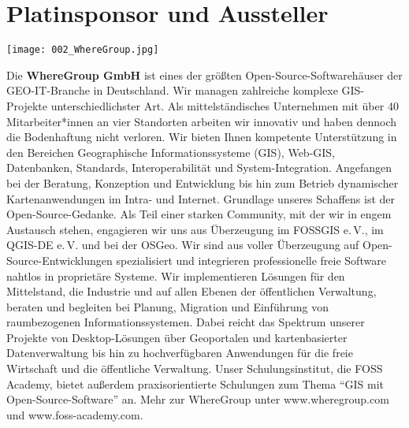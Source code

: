 \section*{Platinsponsor und Aussteller}
\begin{center}
  \centerline{\texttt{[image: 002\_WhereGroup.jpg]}}
\end{center}
\vspace*{-0.4cm}

\noindent
Die {\bfseries WhereGroup GmbH} ist eines der größten Open-Source-Software\-häuser der GEO-IT-Branche in Deutschland. Wir managen zahlreiche komplexe GIS-Projekte unterschiedlichster Art. Als mittelständisches Unternehmen mit über 40 Mitarbeiter*innen an vier Standorten arbeiten wir innovativ und haben dennoch die Bodenhaftung nicht verloren.
Wir bieten Ihnen kompetente Unterstützung in den Bereichen Geographische Informationssysteme (GIS), Web-GIS, Datenbanken, Standards, Interoperabilität und System-Integration. Angefangen bei der Beratung, Konzeption und Entwicklung bis hin zum Betrieb dynamischer Kartenanwendungen im Intra- und Internet.
Grundlage unseres Schaffens ist der Open-Source-Gedanke. Als Teil einer starken Community, mit der wir in engem Austausch stehen, engagieren wir uns aus Überzeugung im FOSSGIS e.\,V., im QGIS-DE e.\,V. und bei der OSGeo. Wir sind aus voller Überzeugung auf Open-Source-Entwicklungen spezialisiert und integrieren professionelle freie Software nahtlos in proprietäre Systeme.
Wir implementieren Lösungen für den Mittelstand, die Industrie und auf allen Ebenen der öffentlichen Verwaltung, beraten und begleiten bei Planung, Migration und Einführung von raumbezogenen Informationssystemen.
Dabei reicht das Spektrum unserer Projekte von Desktop-Lösungen über Geoportalen und kartenbasierter Datenverwaltung bis hin zu hochverfügbaren Anwendungen für die freie Wirtschaft und die öffentliche Verwaltung.
Unser Schulungsinstitut, die FOSS Academy, bietet außerdem praxisorientierte Schulungen zum Thema "`GIS mit Open-Source-Software"' an.
Mehr zur WhereGroup unter www.wheregroup.com und www.foss-academy.com.

